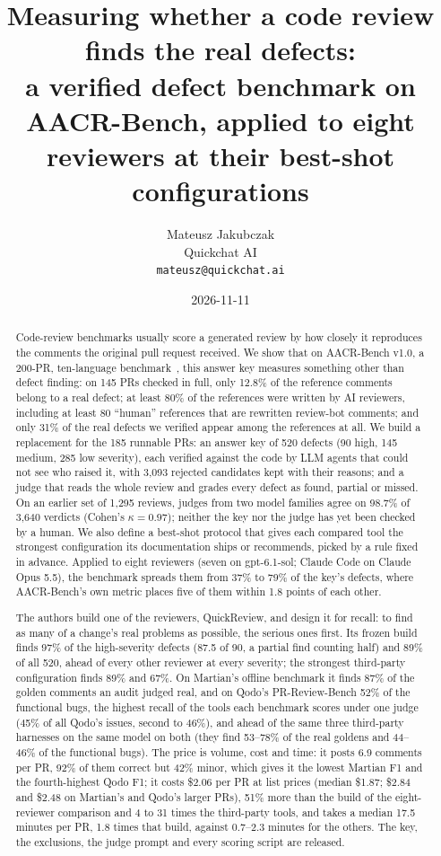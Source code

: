 \documentclass[11pt,a4paper]{article}
\title{Measuring whether a code review finds the real defects:\\
\large a verified defect benchmark on AACR-Bench, applied to eight
reviewers at their best-shot configurations}
\author{Mateusz Jakubczak \\ Quickchat AI \\ \texttt{mateusz@quickchat.ai}}
\date{2026-11-11}
\begin{document}
\maketitle

\begin{abstract}
Code-review benchmarks usually score a generated review by how closely it
reproduces the comments the original pull request received. We show that on
AACR-Bench v1.0, a 200-PR, ten-language benchmark~\cite{aacrbench}, this
answer key measures something other than defect finding: on 145 PRs checked
in full, only 12.8\% of the reference comments belong to a real defect; at
least 80\% of the references were written by AI reviewers, including at
least 80 ``human'' references that are rewritten review-bot comments; and
only 31\% of the real defects we verified appear among the references at
all. We build a replacement for the 185 runnable PRs: an answer key of 520
defects (90 high, 145 medium, 285 low severity), each verified against the
code by LLM agents that could not see who raised it, with 3{,}093 rejected
candidates kept with their reasons; and a judge that reads the whole review
and grades every defect as found, partial or missed. On an earlier set of
1{,}295 reviews, judges from two model families agree on 98.7\% of 3{,}640
verdicts (Cohen's $\kappa = 0.97$); neither the key nor the judge has yet
been checked by a human. We also define a best-shot protocol that gives
each compared tool the strongest configuration its documentation ships or
recommends, picked by a rule fixed in advance. Applied to eight reviewers
(seven on gpt-6.1-sol; Claude Code on Claude Opus 5.5), the benchmark
spreads them from 37\% to 79\% of the key's defects, where AACR-Bench's own
metric places five of them within 1.8 points of each other.

The authors build one of the reviewers, QuickReview, and design it for
recall: to find as many of a change's real problems as possible, the serious
ones first. Its frozen build finds 97\% of the high-severity defects (87.5 of
90, a partial find counting half) and 89\% of all 520, ahead of every other
reviewer at every severity; the strongest third-party configuration finds
89\% and 67\%. On Martian's offline benchmark it finds 87\% of the golden
comments an audit judged real, and on Qodo's PR-Review-Bench 52\% of the
functional bugs, the highest recall of the tools each benchmark scores under
one judge (45\% of all Qodo's issues, second to 46\%), and ahead of the same
three third-party harnesses on the same model on both (they find 53--78\%
of the real goldens and 44--46\% of the functional bugs). The price is volume, cost and time: it posts 6.9 comments per PR,
92\% of them correct but 42\% minor, which gives it the lowest Martian F1
and the fourth-highest Qodo F1; it costs \$2.06 per PR at list prices
(median \$1.87; \$2.84 and \$2.48 on Martian's and Qodo's larger PRs), 51\%
more than the build of the eight-reviewer comparison and 4 to 31 times the
third-party tools, and takes a median 17.5 minutes per PR, 1.8 times that
build, against 0.7--2.3 minutes for the others. The key,
the exclusions, the judge prompt and every scoring script are released.
\end{abstract}
\end{document}
